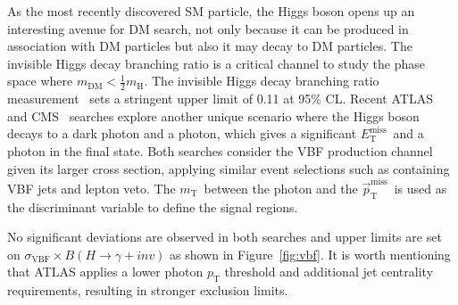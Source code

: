 \documentclass{moriond}
\def\mt{m_{\mathrm{T}}}
\def\et{E_\mathrm{T}^{\mathrm{miss}}}
\def\ptmiss{\vec{p}_\mathrm{T}^{\mathrm{miss}}}
\begin{document}
As the most recently discovered SM particle, the Higgs boson opens up an
interesting avenue for DM search, not only because it can be produced in
association with DM particles but also it may decay to DM particles. The
invisible Higgs decay branching ratio is a critical channel to study the
phase space where $m_{\mathrm{DM}} < \frac{1}{2}m_{\mathrm{H}}$. The invisible Higgs decay branching ratio measurement~\cite{hinv} sets a stringent
upper limit of 0.11 at 95\% CL. Recent ATLAS~\cite{atlasvbf} and
CMS~\cite{cmsvbf} searches explore another unique scenario where the Higgs boson
decays to a dark photon and a photon, which gives a significant $\et$\ and a photon
in the final state. Both searches consider the VBF production channel given its
larger cross section, applying similar event selections such as containing VBF
jets and lepton veto. The $\mt$\ between the photon and the $\ptmiss$\ is used
as the discriminant variable to define the signal regions. 

No significant deviations are observed in both searches and upper limits are set on $\sigma_{\mathrm{VBF}}\times B(H\rightarrow\gamma+inv)$ as shown in Figure~\ref{fig:vbf}. It is worth mentioning that ATLAS applies a lower photon $p_{\mathrm{T}}$ threshold and
additional jet centrality requirements, resulting in stronger exclusion limits.  
\end{document}
